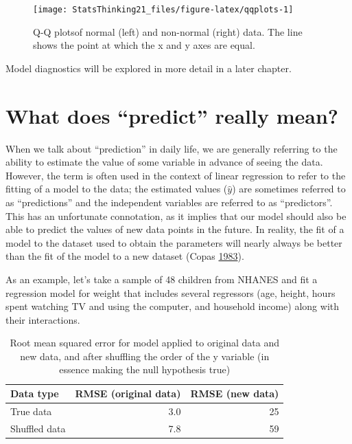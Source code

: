 \documentclass[12pt,]{book}
\theoremstyle{definition}
\theoremstyle{definition}
\theoremstyle{definition}
\theoremstyle{remark}
\begin{document}
\begin{figure}
\texttt{[image: StatsThinking21\_files/figure-latex/qqplots-1]} \caption{Q-Q plotsof normal (left) and non-normal (right) data.  The line shows the point at which the x and y axes are equal.}\label{fig:qqplots}
\end{figure}

Model diagnostics will be explored in more detail in a later chapter.

\hypertarget{what-does-predict-really-mean}{%
\section{What does ``predict'' really mean?}\label{what-does-predict-really-mean}}

When we talk about ``prediction'' in daily life, we are generally referring to the ability to estimate the value of some variable in advance of seeing the data. However, the term is often used in the context of linear regression to refer to the fitting of a model to the data; the estimated values (\(\hat{y}\)) are sometimes referred to as ``predictions'' and the independent variables are referred to as ``predictors''. This has an unfortunate connotation, as it implies that our model should also be able to predict the values of new data points in the future. In reality, the fit of a model to the dataset used to obtain the parameters will nearly always be better than the fit of the model to a new dataset (Copas \protect\hyperlink{ref-copa:1983}{1983}).

As an example, let's take a sample of 48 children from NHANES and fit a regression model for weight that includes several regressors (age, height, hours spent watching TV and using the computer, and household income) along with their interactions.

\begin{table}

\caption{\label{tab:unnamed-chunk-108}Root mean squared error for model applied to original data and new data, and after shuffling the order of the y variable (in essence making the null hypothesis true)}
\centering
\begin{tabular}[t]{l|r|r}
\hline
Data type & RMSE (original data) & RMSE (new data)\\
\hline
True data & 3.0 & 25\\
\hline
Shuffled data & 7.8 & 59\\
\hline
\end{tabular}
\end{table}
\end{document}
